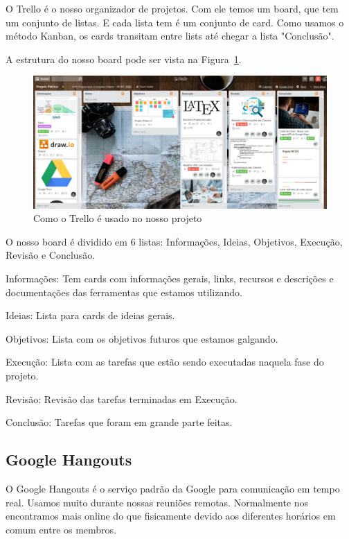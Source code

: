 \documentclass[a4paper,11pt,fleqn]{article}
\begin{document}
O Trello é o nosso organizador de projetos. Com ele temos um board, que tem um conjunto de listas. E cada lista tem é um conjunto de card.
  Como usamos o método Kanban, os cards transitam entre lists até chegar a lista "Conclusão".

A estrutura do nosso board pode ser vista na Figura~\ref{f:trello}.

\begin{figure}[h!]
  \begin{center}
    \includegraphics[scale=0.3]{imagens/trello.png}
  \end{center}
  \caption{Como o Trello é usado no nosso projeto}
  \label{f:trello}
\end{figure}

O nosso board é dividido em 6 listas: Informações, Ideias, Objetivos, Execução, Revisão e Conclusão.

Informações: Tem cards com informações gerais, links, recursos e descrições e documentações das ferramentas que estamos utilizando.

Ideias: Lista para cards de ideias gerais.

Objetivos: Lista com os objetivos futuros que estamos galgando.

Execução: Lista com as tarefas que estão sendo executadas naquela fase do projeto.

Revisão: Revisão das tarefas terminadas em Execução.

Conclusão: Tarefas que foram em grande parte feitas.

\subsection{Google Hangouts}
\label{ss:google-hangouts}

O Google Hangouts é o serviço padrão da Google para comunicação em tempo real.
  Usamos muito durante nossas reuniões remotas. Normalmente nos encontramos mais online
    do que fisicamente devido aos diferentes horários em comum entre os membros.
\end{document}
